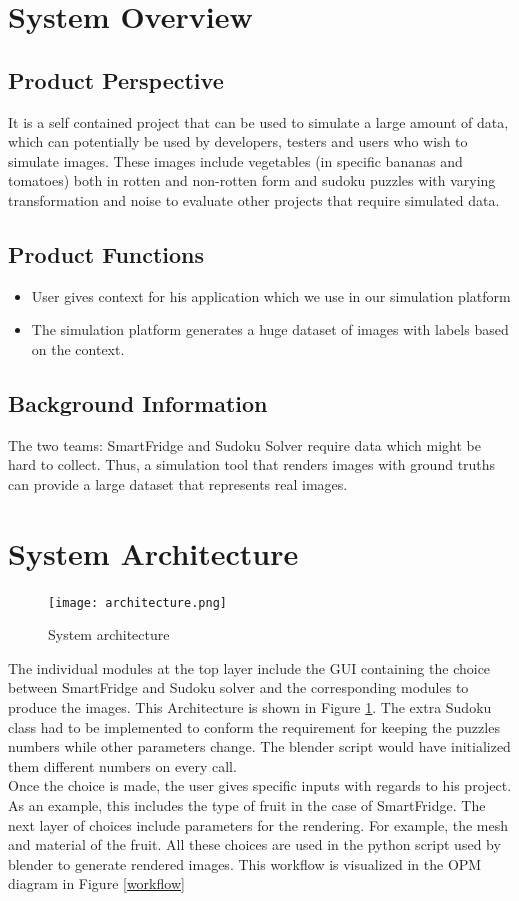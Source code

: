 \documentclass[a4paper,12pt]{article}
\begin{document}
\newpage
\section{System Overview}
\subsection{Product Perspective}
It is a self contained project that can be used to simulate a large amount of data, which can potentially be used by developers, testers and users who wish to simulate images. These images include vegetables (in specific bananas and tomatoes) both in rotten and non-rotten form and sudoku puzzles with varying transformation and noise to evaluate other projects that require simulated data.

\subsection{Product Functions}
\begin{itemize}
\item User gives context for his application which we use in our simulation platform
\item The simulation platform generates a huge dataset of images with labels based on the context.
\end{itemize}
\subsection{Background Information}
The two teams: SmartFridge and Sudoku Solver require data which might be hard to collect. Thus, a simulation tool that renders images with ground truths can provide a large dataset that represents real images.
\section{System Architecture}
\begin{figure}[H]
\texttt{[image: architecture.png]}
\caption{System architecture}
\label{architecture}
\end{figure}
The individual modules at the top layer include the GUI containing the choice between SmartFridge and Sudoku solver and the corresponding modules to produce the images. This Architecture is shown in Figure \ref{architecture}. The extra Sudoku class had to be implemented to conform the requirement for keeping the puzzles numbers while other parameters change. The blender script would have initialized them different numbers on every call.\\
Once the choice is made, the user gives specific inputs with regards to his project. As an example, this includes the type of fruit in the case of SmartFridge. The next layer of choices include parameters for the rendering. For example, the mesh and material of the fruit. All these choices are used in the python script used by blender to generate rendered images. This workflow is visualized in the OPM diagram in Figure \ref{workflow}
\end{document}
